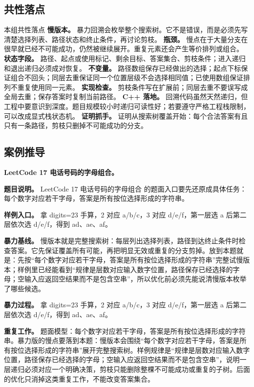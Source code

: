 \subsection{共性落点}

\begin{principlebox}{本组共性落点}
\textbf{慢版本。} 暴力回溯会枚举整个搜索树。它不是错误，而是必须先写清楚选择列表、路径状态和终止条件，再讨论剪枝。
\textbf{瓶颈。} 慢点在于大量分支在很早就已经不可能成功，仍然被继续展开。重复元素还会产生等价排列或组合。
\textbf{状态字段。} 路径、起点或使用标记、剩余目标、答案集合、剪枝条件；进入递归和退出递归必须成对恢复。
\textbf{不变量。} 路径数组保存已经做出的选择；起点下标保证组合不回头；同层去重保证同一个位置层级不会选择相同值；已使用数组保证排列不重复使用同一元素。
\textbf{实现检查。} 剪枝条件写在扩展前；同层去重不要误写成全局去重；保存答案时复制当前路径。
\textbf{C++ 落地。} 回溯代码虽然天然递归，但工程中要意识到深度。题目规模较小时递归可读性好；若要遵守严格工程栈限制，可以改成显式栈状态机。
\textbf{证明抓手。} 证明从搜索树覆盖开始：每个合法答案有且只有一条路径，剪枝只删掉不可能成功的分支。
\end{principlebox}

\subsection{案例推导}

\noindent\textbf{LeetCode 17 电话号码的字母组合。}

\textbf{题目说明。} LeetCode 17 电话号码的字母组合 的题面入口要先还原成具体任务：每个数字对应若干字母，答案是所有按位选择形成的字符串。

\textbf{样例入口。} 拿 digits=23 手算，2 对应 a/b/c，3 对应 d/e/f，第一层选 a 后第二层依次选 d/e/f，得到 ad、ae、af。

\textbf{暴力基线。} 慢版本就是完整搜索树：每层列出选择列表，路径到达终止条件时检查答案。它先保证覆盖所有可能，再把明显无效或重复的分支剪掉。放到本题就是：先按“每个数字对应若干字母，答案是所有按位选择形成的字符串”完整试慢版本；样例里已经能看到“规律是层数对应输入数字位置，路径保存已经选择的字母；空输入应返回空结果而不是包含空串”，所以优化前必须先能说清慢版本枚举了哪些候选。

\textbf{暴力过程。} 拿 digits=23 手算，2 对应 a/b/c，3 对应 d/e/f，第一层选 a 后第二层依次选 d/e/f，得到 ad、ae、af。

\textbf{重复工作。} 题面模型：每个数字对应若干字母，答案是所有按位选择形成的字符串。暴力版的慢点要落到本题：慢版本会围绕“每个数字对应若干字母，答案是所有按位选择形成的字符串”展开完整搜索树。样例规律是“规律是层数对应输入数字位置，路径保存已经选择的字母；空输入应返回空结果而不是包含空串”，说明一层递归必须对应一个明确决策，剪枝只能删除整棵不可能成功或重复的子树。后面的优化只消掉这类重复工作，不能改变答案集合。

